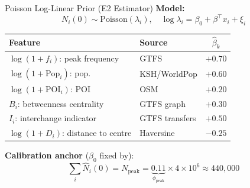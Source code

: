 \documentclass[aspectratio=169,12pt]{beamer}
\begin{document}
\begin{frame}{Poisson Log-Linear Prior (E2 Estimator)}
\textbf{Model:}
\[
N_i(0)\sim\mathrm{Poisson}(\lambda_i),\quad
\log\lambda_i = \beta_0 + \beta^\top x_i + \xi_i
\]
\begin{center}
\begin{tabular}{llc}
\toprule
Feature & Source & $\hat\beta_k$ \\
\midrule
$\log(1+f_i)$: peak frequency      & GTFS                & $+0.70$ \\
$\log(1+\mathrm{Pop}_i)$: pop.     & KSH/WorldPop        & $+0.60$ \\
$\log(1+\mathrm{POI}_i)$: POI      & OSM                 & $+0.20$ \\
$B_i$: betweenness centrality       & GTFS graph          & $+0.30$ \\
$I_i$: interchange indicator        & GTFS transfers      & $+0.50$ \\
$\log(1+D_i)$: distance to centre   & Haversine           & $-0.25$ \\
\bottomrule
\end{tabular}
\end{center}

\textbf{Calibration anchor} ($\beta_0$ fixed by):
\[
\textstyle\sum_i\hat N_i(0)=N_{\mathrm{peak}}=\underbrace{0.11}_{\phi_{\mathrm{peak}}}\times4\times10^6\approx440{,}000
\]
\end{frame}
\end{document}
